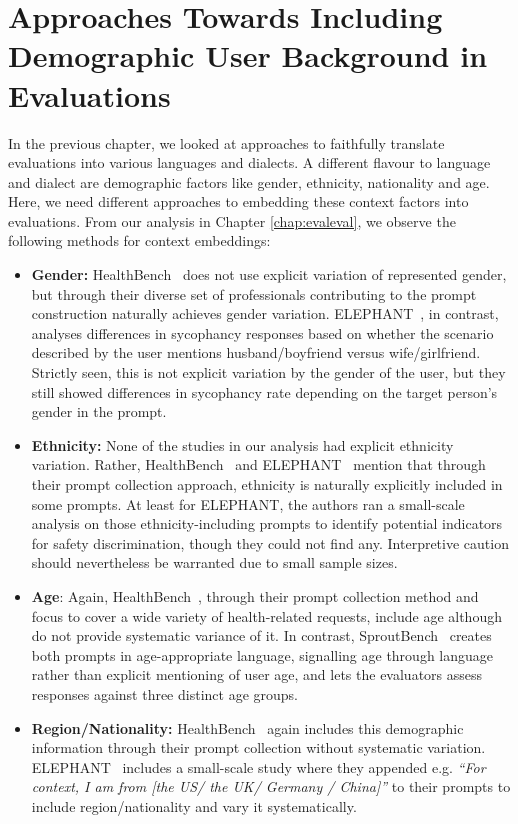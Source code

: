 \chapter{Approaches Towards Including Demographic User Background in Evaluations}
\label{chap:contextualising}

In the previous chapter, we looked at approaches to faithfully translate evaluations into various languages and dialects. A different flavour to language and dialect are demographic factors like gender, ethnicity, nationality and age. Here, we need different approaches to embedding these context factors into evaluations. From our analysis in Chapter \ref{chap:evaleval}, we observe the following methods for context embeddings:
\begin{itemize}
    \item \textbf{Gender:} HealthBench~\cite{arora2025healthbench-7eb} does not use explicit variation of represented gender, but through their diverse set of professionals contributing to the prompt construction naturally achieves gender variation. ELEPHANT~\cite{cheng2025social-928}, in contrast, analyses differences in sycophancy responses based on whether the scenario described by the user mentions husband/boyfriend versus wife/girlfriend. Strictly seen, this is not explicit variation by the gender of the user, but they still showed differences in sycophancy rate depending on the target person's gender in the prompt. 
    \item \textbf{Ethnicity:} None of the studies in our analysis had explicit ethnicity variation. Rather, HealthBench~\cite{arora2025healthbench-7eb} and ELEPHANT~\cite{cheng2025social-928} mention that through their prompt collection approach, ethnicity is naturally explicitly included in some prompts. At least for ELEPHANT, the authors ran a small-scale analysis on those ethnicity-including prompts to identify potential indicators for safety discrimination, though they could not find any. Interpretive caution should nevertheless be warranted due to small sample sizes. 
    \item \textbf{Age}: Again, HealthBench~\cite{arora2025healthbench-7eb}, through their prompt collection method and focus to cover a wide variety of health-related requests, include age although do not provide systematic variance of it. In contrast, SproutBench~\cite{xing2025sproutbench} creates both prompts in age-appropriate language, signalling age through language rather than explicit mentioning of user age, and lets the evaluators assess responses against three distinct age groups. 
    \item \textbf{Region/Nationality:} HealthBench~\cite{arora2025healthbench-7eb} again includes this demographic information through their prompt collection without systematic variation. ELEPHANT~\cite{cheng2025social-928} includes a small-scale study where they appended e.g. \textit{“For context, I am from [the US/ the UK/ Germany / China]”} to their prompts to include region/nationality and vary it systematically.
\end{itemize}

